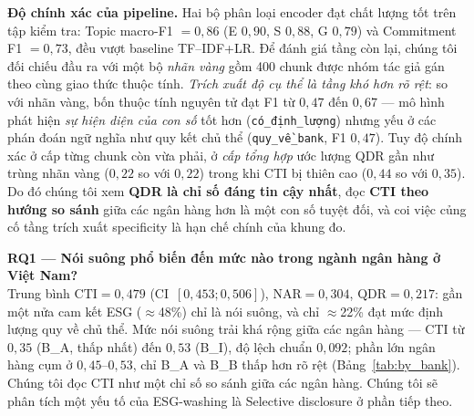 \documentclass[runningheads]{llncs}
\begin{document}
\noindent\textbf{Độ chính xác của pipeline.} Hai bộ phân loại encoder đạt chất lượng tốt trên tập kiểm tra: Topic macro-F1 $=0{,}86$ (E $0{,}90$, S $0{,}88$, G $0{,}79$) và Commitment F1 $=0{,}73$, đều vượt baseline TF--IDF+LR. Để đánh giá tầng còn lại, chúng tôi đối chiếu đầu ra với một bộ \emph{nhãn vàng} gồm 400 chunk được nhóm tác giả gán theo cùng giao thức thuộc tính. \emph{Trích xuất độ cụ thể là tầng khó hơn rõ rệt}: so với nhãn vàng, bốn thuộc tính nguyên tử đạt F1 từ $0{,}47$ đến $0{,}67$ --- mô hình phát hiện \emph{sự hiện diện của con số} tốt hơn (\texttt{có\_định\_lượng}) nhưng yếu ở các phán đoán ngữ nghĩa như quy kết chủ thể (\texttt{quy\_về\_bank}, F1 $0{,}47$). Tuy độ chính xác ở cấp từng chunk còn vừa phải, ở \emph{cấp tổng hợp} ước lượng QDR gần như trùng nhãn vàng ($0{,}22$ so với $0{,}22$) trong khi CTI bị thiên cao ($0{,}44$ so với $0{,}35$). Do đó chúng tôi xem \textbf{QDR là chỉ số đáng tin cậy nhất}, đọc \textbf{CTI theo hướng so sánh} giữa các ngân hàng hơn là một con số tuyệt đối, và coi việc củng cố tầng trích xuất specificity là hạn chế chính của khung đo.

\noindent\textbf{RQ1 --- Nói suông phổ biến đến mức nào trong ngành ngân hàng ở Việt Nam?}\\
Trung bình $\mathrm{CTI}=0{,}479$ (CI~$[0{,}453;0{,}506]$), $\mathrm{NAR}=0{,}304$, $\mathrm{QDR}=0{,}217$: gần một nửa cam kết ESG (\(\approx\)48\%) chỉ là nói suông, và chỉ \(\approx\)22\% đạt mức định lượng quy về chủ thể. Mức nói suông trải khá rộng giữa các ngân hàng --- CTI từ $0{,}35$ (B\_A, thấp nhất) đến $0{,}53$ (B\_I), độ lệch chuẩn $0{,}092$; phần lớn ngân hàng cụm ở $0{,}45$--$0{,}53$, chỉ B\_A và B\_B thấp hơn rõ rệt (Bảng~\ref{tab:by_bank}). Chúng tôi đọc CTI như một chỉ số so sánh giữa các ngân hàng. Chúng tôi sẽ phân tích một yếu tố của ESG-washing là Selective disclosure \cite{marquis2016scrutiny} ở phần tiếp theo.
\end{document}
